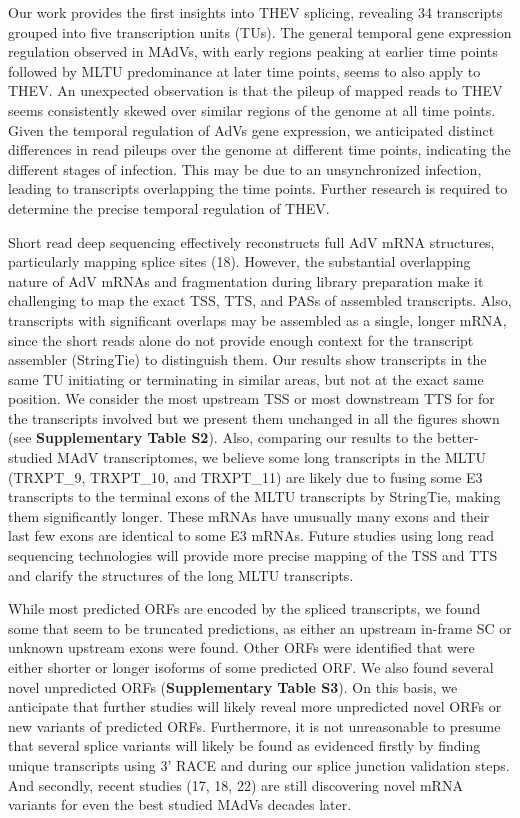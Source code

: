 \documentclass[
]{article}
\begin{document}
Our work provides the first insights into THEV splicing, revealing 34
transcripts grouped into five transcription units (TUs). The general
temporal gene expression regulation observed in MAdVs, with early
regions peaking at earlier time points followed by MLTU predominance at
later time points, seems to also apply to THEV. An unexpected
observation is that the pileup of mapped reads to THEV seems
consistently skewed over similar regions of the genome at all time
points. Given the temporal regulation of AdVs gene expression, we
anticipated distinct differences in read pileups over the genome at
different time points, indicating the different stages of infection.
This may be due to an unsynchronized infection, leading to transcripts
overlapping the time points. Further research is required to determine
the precise temporal regulation of THEV.

Short read deep sequencing effectively reconstructs full AdV mRNA
structures, particularly mapping splice sites (18). However, the
substantial overlapping nature of AdV mRNAs and fragmentation during
library preparation make it challenging to map the exact TSS, TTS, and
PASs of assembled transcripts. Also, transcripts with significant
overlaps may be assembled as a single, longer mRNA, since the short
reads alone do not provide enough context for the transcript assembler
(StringTie) to distinguish them. Our results show transcripts in the
same TU initiating or terminating in similar areas, but not at the exact
same position. We consider the most upstream TSS or most downstream TTS
for for the transcripts involved but we present them unchanged in all
the figures shown (see \textbf{Supplementary Table S2}). Also, comparing
our results to the better-studied MAdV transcriptomes, we believe some
long transcripts in the MLTU (TRXPT\_9, TRXPT\_10, and TRXPT\_11) are
likely due to fusing some E3 transcripts to the terminal exons of the
MLTU transcripts by StringTie, making them significantly longer. These
mRNAs have unusually many exons and their last few exons are identical
to some E3 mRNAs. Future studies using long read sequencing technologies
will provide more precise mapping of the TSS and TTS and clarify the
structures of the long MLTU transcripts.

While most predicted ORFs are encoded by the spliced transcripts, we
found some that seem to be truncated predictions, as either an upstream
in-frame SC or unknown upstream exons were found. Other ORFs were
identified that were either shorter or longer isoforms of some predicted
ORF. We also found several novel unpredicted ORFs (\textbf{Supplementary
Table S3}). On this basis, we anticipate that further studies will
likely reveal more unpredicted novel ORFs or new variants of predicted
ORFs. Furthermore, it is not unreasonable to presume that several splice
variants will likely be found as evidenced firstly by finding unique
transcripts using 3' RACE and during our splice junction validation
steps. And secondly, recent studies (17, 18, 22) are still discovering
novel mRNA variants for even the best studied MAdVs decades later.
\end{document}
